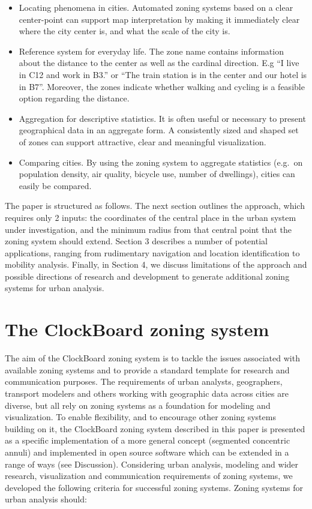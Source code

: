 \documentclass{josis}
\begin{document}
\begin{itemize}
\item
  Locating phenomena in cities.
  Automated zoning systems based on a clear center-point can support map interpretation by making it immediately clear where the city center is, and what the scale of the city is.
\item
  Reference system for everyday life.
  The zone name contains information about the distance to the center as well as the cardinal direction.
  E.g ``I live in C12 and work in B3.'' or ``The train station is in the center and our hotel is in B7''.
  Moreover, the zones indicate whether walking and cycling is a feasible option regarding the distance.
\item
  Aggregation for descriptive statistics.
  It is often useful or necessary to present geographical data in an aggregate form.
  A consistently sized and shaped set of zones can support attractive, clear and meaningful visualization.
\item
  Comparing cities.
  By using the zoning system to aggregate statistics (e.g.~on population density, air quality, bicycle use, number of dwellings), cities can easily be compared.
\end{itemize}

The paper is structured as follows.
The next section outlines the approach, which requires only 2 inputs: the coordinates of the central place in the urban system under investigation, and the minimum radius from that central point that the zoning system should extend.
Section 3 describes a number of potential applications, ranging from rudimentary navigation and location identification to mobility analysis.
Finally, in Section 4, we discuss limitations of the approach and possible directions of research and development to generate additional zoning systems for urban analysis.

\hypertarget{clockzs}{%
\section{The ClockBoard zoning system}\label{clockzs}}

The aim of the ClockBoard zoning system is to tackle the issues associated with available zoning systems and to provide a standard template for research and communication purposes.
The requirements of urban analysts, geographers, transport modelers and others working with geographic data across cities are diverse, but all rely on zoning systems as a foundation for modeling and visualization.
To enable flexibility, and to encourage other zoning systems building on it, the ClockBoard zoning system described in this paper is presented as a specific implementation of a more general concept (segmented concentric annuli) and implemented in open source software which can be extended in a range of ways (see Discussion).
Considering urban analysis, modeling and wider research, visualization and communication requirements of zoning systems, we developed the following criteria for successful zoning systems.
Zoning systems for urban analysis should:
\end{document}
